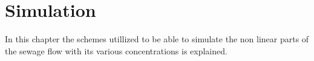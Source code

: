 \chapter{Simulation}\label{ch:simulation}
In this chapter the schemes utillized to be able to simulate the non linear parts of the sewage flow with its various concentrations is explained.
